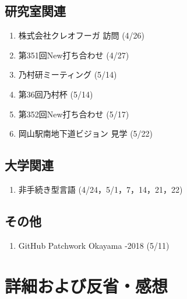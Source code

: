 \documentclass[fleqn, 14pt]{extarticle}
\begin{document}
\subsection{研究室関連}
\label{sec2-2}
\begin{enumerate}
\item 株式会社クレオフーガ 訪問
  \hfill
  \label{sec2-2-enum1}
  (4/26)
\item 第351回New打ち合わせ
  \hfill
  \label{sec2-2-enum2}
  (4/27)
\item 乃村研ミーティング
  \hfill
  \label{sec2-2-enum3}
  (5/14)
\item 第36回乃村杯
  \hfill
  \label{sec2-2-enum4}
  (5/14)
\item 第352回New打ち合わせ
  \hfill
  \label{sec2-2-enum5}
  (5/17)
\item 岡山駅南地下道ビジョン 見学
  \hfill
  \label{sec2-2-enum6}
  (5/22)
\end{enumerate}

\subsection{大学関連}
\label{sec2-3}
\begin{enumerate}
\item 非手続き型言語
  \hfill
  \label{sec2-3-enum1}
  (4/24，5/1，7，14，21，22)
\end{enumerate}

\subsection{その他}
\label{sec2-4}
\begin{enumerate}
\item GitHub Patchwork Okayama -2018
  \hfill
  \label{sec2-4-enum1}
  (5/11)
\end{enumerate}

\section{詳細および反省・感想}
\label{sec3}
\end{document}
